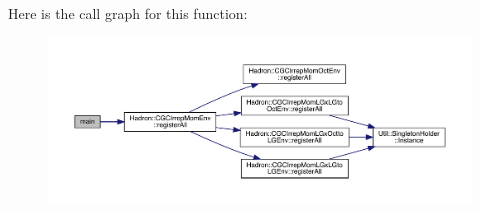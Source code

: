 Here is the call graph for this function\+:
\nopagebreak
\begin{figure}[H]
\begin{center}
\leavevmode
\includegraphics[width=350pt]{d1/d5f/adat-devel_2main_2dbutil_2dbconvert__read_8cc_a3c04138a5bfe5d72780bb7e82a18e627_cgraph}
\end{center}
\end{figure}
